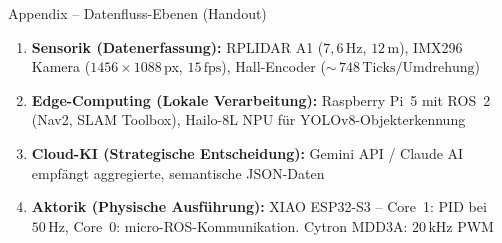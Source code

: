 \documentclass[aspectratio=169]{beamer}
\begin{document}
\begin{frame}{Appendix -- Datenfluss-Ebenen (Handout)}

  {\small
  \begin{enumerate}
    \item \textbf{Sensorik (Datenerfassung):}
          RPLIDAR A1 ($7{,}6\,\mathrm{Hz}$, $12\,\mathrm{m}$),
          IMX296 Kamera ($1456 \times 1088$\,px, $15\,\mathrm{fps}$),
          Hall-Encoder (${\sim}\,748\,\mathrm{Ticks/Umdrehung}$)

    \item \textbf{Edge-Computing (Lokale Verarbeitung):}
          Raspberry Pi~5 mit ROS~2 (Nav2, SLAM Toolbox),
          Hailo-8L NPU für YOLOv8-Objekterkennung

    \item \textbf{Cloud-KI (Strategische Entscheidung):}
          Gemini API / Claude AI empfängt aggregierte, semantische
          JSON-Daten

    \item \textbf{Aktorik (Physische Ausführung):}
          XIAO ESP32-S3 -- Core~1: PID bei $50\,\mathrm{Hz}$,
          Core~0: micro-ROS-Kommunikation.
          Cytron MDD3A: $20\,\mathrm{kHz}$ PWM
  \end{enumerate}}

\end{frame}

\end{document}
